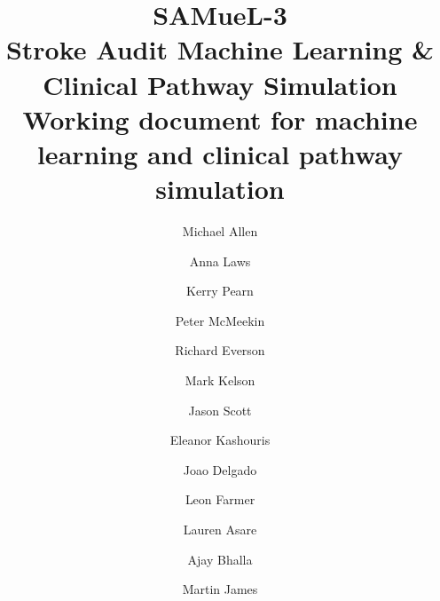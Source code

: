 \title{%
  SAMueL-3\\[0.5em]
  \large Stroke Audit Machine Learning \& Clinical Pathway Simulation \\ Working document for machine learning and clinical pathway simulation
}


\renewcommand{\thefootnote}{\fnsymbol{footnote}}
\author[*1,2]{Michael Allen}
\author[1,2]{Anna Laws}
\author[1,2]{Kerry Pearn}
\author[4]{Peter McMeekin}
\author[3]{Richard Everson}
\author[3]{Mark Kelson}
\author[4]{Jason Scott}
\author[4]{Eleanor Kashouris}
\author[1]{Joao Delgado}
\author[1,2]{Leon Farmer}
\author[1,2]{Lauren Asare}
\author[5]{Ajay Bhalla}
\author[1,2]{Martin James}


\date{}